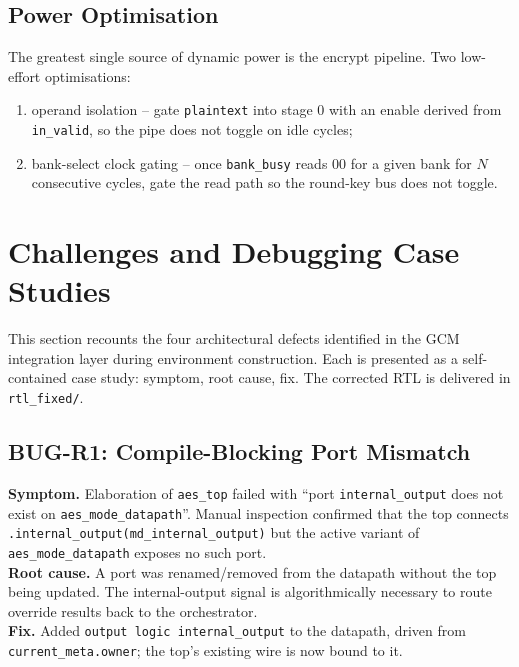 \documentclass[conference,10pt,a4paper]{IEEEtran}
\begin{document}
\subsection{Power Optimisation}
The greatest single source of dynamic power is the encrypt pipeline.
Two low-effort optimisations:
\begin{enumerate}
  \item operand isolation -- gate \texttt{plaintext} into stage 0 with
        an enable derived from \texttt{in\_valid}, so the pipe does
        not toggle on idle cycles;
  \item bank-select clock gating -- once \texttt{bank\_busy} reads 00
        for a given bank for $N$ consecutive cycles, gate the read
        path so the round-key bus does not toggle.
\end{enumerate}

\section{Challenges and Debugging Case Studies}
\label{sec:debug}

This section recounts the four architectural defects identified in the
GCM integration layer during environment construction.  Each is
presented as a self-contained case study: symptom, root cause, fix.
The corrected RTL is delivered in \texttt{rtl\_fixed/}.

\subsection{BUG-R1: Compile-Blocking Port Mismatch}
\textbf{Symptom.}  Elaboration of \texttt{aes\_top} failed with
``port \texttt{internal\_output} does not exist on
\texttt{aes\_mode\_datapath}''.  Manual inspection confirmed that the
top connects \texttt{.internal\_output(md\_internal\_output)} but the
active variant of \texttt{aes\_mode\_datapath} exposes no such port.\\
\textbf{Root cause.}  A port was renamed/removed from the datapath
without the top being updated.  The internal-output signal is
algorithmically necessary to route override results back to the
orchestrator.\\
\textbf{Fix.}  Added \texttt{output logic internal\_output} to the
datapath, driven from \texttt{current\_meta.owner}; the top's existing
wire is now bound to it.
\end{document}
